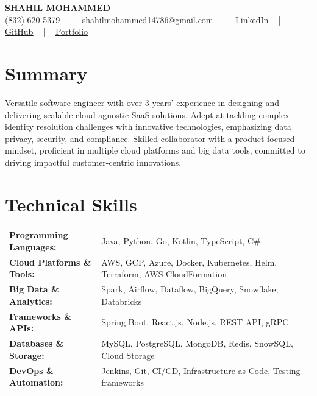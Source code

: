 \documentclass[letterpaper,11pt]{article}
\begin{document}
\begin{center}
    {\fontsize{14pt}{12pt}\selectfont \textbf{\MakeUppercase{Shahil Mohammed}}}\\ \vspace{2pt}
    \fontsize{10pt}{12pt}\selectfont (832) 620-5379 ~ | ~ \href{mailto:shahilmohammed14786@gmail.com}{shahilmohammed14786@gmail.com} ~ | ~  
    \href{https://www.linkedin.com/in/shahil-mohammed-9652931a1/}{\color{blue}\underline{LinkedIn}}  ~ | ~ 
    \href{https://github.com/freakbeast14}{\color{blue}\underline{GitHub}} ~ | ~ 
    \href{https://shahil-mohammed.netlify.app/}{\color{blue}\underline{Portfolio}}
    \vspace{-8pt}
\end{center}

\section{Summary}
\fontsize{9pt}{10pt}\selectfont
Versatile software engineer with over 3 years’ experience in designing and delivering scalable cloud-agnostic SaaS solutions. Adept at tackling complex identity resolution challenges with innovative technologies, emphasizing data privacy, security, and compliance. Skilled collaborator with a product-focused mindset, proficient in multiple cloud platforms and big data tools, committed to driving impactful customer-centric innovations.
 \vspace{-5pt}
 
\section{Technical Skills}
        \vspace{-14pt}
        \begin{table}[h]
            \fontsize{9pt}{10pt}\selectfont
            \begin{tabular}{p{0.3\linewidth} p{0.7\linewidth}}
                \textbf{Programming Languages:} & Java, Python, Go, Kotlin, TypeScript, C\# \\
                \textbf{Cloud Platforms \& Tools:} & AWS, GCP, Azure, Docker, Kubernetes, Helm, Terraform, AWS CloudFormation \\
                \textbf{Big Data \& Analytics:} & Spark, Airflow, Dataflow, BigQuery, Snowflake, Databricks \\
                \textbf{Frameworks \& APIs:} & Spring Boot, React.js, Node.js, REST API, gRPC \\
                \textbf{Databases \& Storage:} & MySQL, PostgreSQL, MongoDB, Redis, SnowSQL, Cloud Storage \\
                \textbf{DevOps \& Automation:} & Jenkins, Git, CI/CD, Infrastructure as Code, Testing frameworks \\
            \end{tabular}
        \end{table}
 \vspace{-15pt}
 
\end{document}
